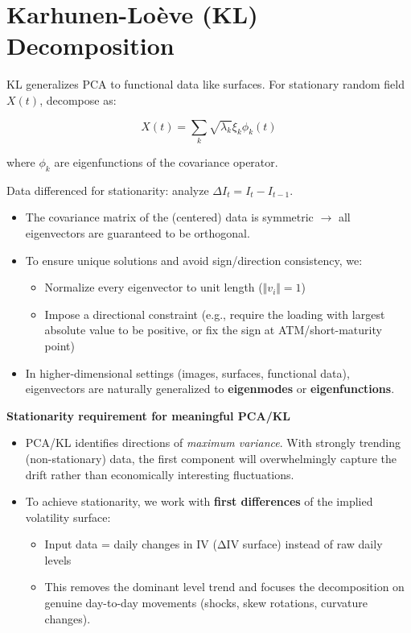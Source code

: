 \documentclass[a4paper,12pt]{report}
\begin{document}
\section{Karhunen-Lo\`eve (KL) Decomposition}
KL generalizes PCA to functional data like surfaces. For stationary random field $X(t)$, decompose as:

\[
X(t) = \sum_k \sqrt{\lambda_k} \xi_k \phi_k(t)
\]

where $\phi_k$ are eigenfunctions of the covariance operator.

Data differenced for stationarity: analyze $\Delta I_t = I_t - I_{t-1}$.


\begin{itemize}
    \item The covariance matrix of the (centered) data is symmetric $\to$ all eigenvectors are guaranteed to be orthogonal.
    \item To ensure unique solutions and avoid sign/direction consistency, we:
    \begin{itemize}
        \item Normalize every eigenvector to unit length ($\Vert v_i \Vert = 1$)
        \item Impose a directional constraint (e.g., require the loading with largest absolute value to be positive, or fix the sign at ATM/short-maturity point)
    \end{itemize}
    \item In higher-dimensional settings (images, surfaces, functional data), eigenvectors are naturally generalized to \textbf{eigenmodes} or \textbf{eigenfunctions}.
\end{itemize}

\textbf{Stationarity requirement for meaningful PCA/KL}  
\begin{itemize}
    \item PCA/KL identifies directions of \textit{maximum variance}. With strongly trending (non-stationary) data, the first component will overwhelmingly capture the drift rather than economically interesting fluctuations.
    \item To achieve stationarity, we work with \textbf{first differences} of the implied volatility surface:
    \begin{itemize}
        \item Input data = daily changes in IV (ΔIV surface) instead of raw daily levels
        \item This removes the dominant level trend and focuses the decomposition on genuine day-to-day movements (shocks, skew rotations, curvature changes).
    \end{itemize}
\end{itemize}
\end{document}
